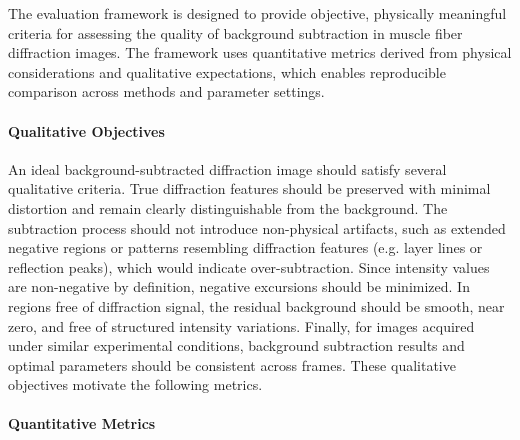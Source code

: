 \documentclass[iucr]{iucrjournals}
\begin{document}
The evaluation framework is designed to provide objective, physically meaningful criteria for assessing the quality of background subtraction in muscle fiber diffraction images. The framework uses quantitative metrics derived from physical considerations and qualitative expectations, which enables reproducible comparison across methods and parameter settings.

\paragraph{Qualitative Objectives}

An ideal background-subtracted diffraction image should satisfy several qualitative criteria. True diffraction features should be preserved with minimal distortion and remain clearly distinguishable from the background. The subtraction process should not introduce non-physical artifacts, such as extended negative regions or patterns resembling diffraction features (e.g. layer lines or reflection peaks), which would indicate over-subtraction. Since intensity values are non-negative by definition, negative excursions should be minimized. In regions free of diffraction signal, the residual background should be smooth, near zero, and free of structured intensity variations. Finally, for images acquired under similar experimental conditions, background subtraction results and optimal parameters should be consistent across frames. These qualitative objectives motivate the following metrics.

\paragraph{Quantitative Metrics}
\end{document}
